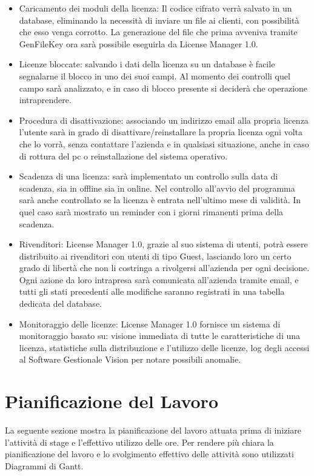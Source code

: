 \begin{itemize}
\item	Caricamento dei moduli della licenza: Il codice cifrato verrà salvato in un database, eliminando la necessità di inviare un file ai clienti, con possibilità che esso venga corrotto. La generazione del file che prima avveniva tramite GenFileKey ora sarà possibile eseguirla da License Manager 1.0.
\item	Licenze bloccate: salvando i dati della licenza su un database è facile segnalarne il blocco in uno dei suoi campi. Al momento dei controlli quel campo sarà analizzato, e in caso di blocco presente si deciderà che operazione intraprendere. 
\item	Procedura di disattivazione: associando un indirizzo email alla propria licenza l’utente sarà in grado di disattivare/reinstallare la propria licenza ogni volta che lo vorrà, senza contattare l’azienda e in qualsiasi situazione, anche in caso di rottura del pc o reinstallazione del sistema operativo.
\item	Scadenza di una licenza: sarà implementato un controllo sulla data di scadenza, sia in offline sia in online. Nel controllo all’avvio del programma sarà anche controllato se la licenza è entrata nell’ultimo mese di validità. In quel caso sarà mostrato un reminder con i giorni rimanenti prima della scadenza. 
\item	Rivenditori: License Manager 1.0, grazie al suo sistema di utenti, potrà essere distribuito ai rivenditori con utenti di tipo Guest, lasciando loro un certo grado di libertà che non li costringa a rivolgersi all’azienda per ogni decisione. Ogni azione da loro intrapresa sarà comunicata all’azienda tramite email, e tutti gli stati precedenti alle modifiche saranno registrati in una tabella dedicata del database.
\item	Monitoraggio delle licenze: License Manager 1.0 fornisce un sistema di monitoraggio basato su: visione immediata di tutte le caratteristiche di una licenza, statistiche sulla distribuzione e l’utilizzo delle licenze, log degli accessi al Software Gestionale Vision per notare possibili anomalie.


\end{itemize}

\section{Pianificazione del Lavoro}

La seguente sezione mostra la pianificazione del lavoro attuata prima di iniziare l'attività di stage e l'effettivo utilizzo delle ore. Per rendere più chiara la pianificazione del lavoro e lo svolgimento effettivo delle attività sono utilizzati Diagrammi di Gantt.

